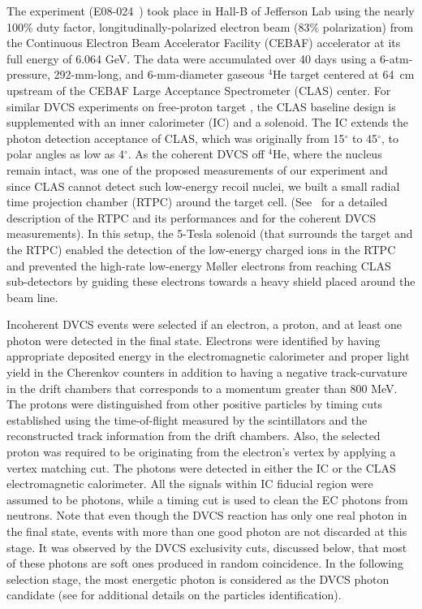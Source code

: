 \documentclass[twocolumn,nofootinbib,showpacs,prl,superscriptaddress,secnumarabic,amssymb,nobibnotes,aps,floatfix]{revtex4}
\begin{document}
The experiment (E08-024~\cite{Hafidi:2008pr}) took place in Hall-B of Jefferson 
Lab using the nearly 100\% duty factor, longitudinally-polarized electron beam 
(83$\%$ polarization) from the Continuous Electron Beam Accelerator Facility 
(CEBAF) accelerator at its full energy of 6.064 GeV. The data were accumulated 
over 40 days using a 6-atm-pressure, 292-mm-long, and 6-mm-diameter gaseous 
$^4$He target centered at 64~cm upstream of the CEBAF Large Acceptance 
Spectrometer (CLAS) center. For similar DVCS experiments on free-proton target
\cite{Girod:2007aa,Jo:2015ema}, the CLAS baseline design \cite{Mecking:2003zu} 
is supplemented with an inner calorimeter (IC) and a solenoid. The IC extends 
the photon detection acceptance of CLAS, which was originally from 15$^{\circ}$ 
to 45$^{\circ}$, to polar angles as low as 4$^{\circ}$. As the coherent DVCS 
off $^4$He, where the nucleus remain intact, was one of the proposed 
measurements of our experiment and since CLAS cannot detect such low-energy 
recoil nuclei, we built a small radial time projection chamber (RTPC) around 
the target cell. (See~\cite{Dupre:2017upj} for a detailed description of the 
RTPC and its performances and \cite{Hattawy:2017woc} for the coherent DVCS 
measurements). In this setup, the 5-Tesla solenoid (that surrounds the target 
and the RTPC) enabled the detection of the low-energy charged ions in the RTPC 
and prevented the high-rate low-energy M\o{}ller electrons from reaching CLAS 
sub-detectors by guiding these electrons towards a heavy shield placed around 
the beam line. 


Incoherent DVCS events were selected if an electron, a proton, and at least one 
photon were detected in the final state. Electrons were identified by having 
appropriate deposited energy in the electromagnetic calorimeter and proper 
light yield in the Cherenkov counters in addition to having a negative 
track-curvature in the drift chambers that corresponds to a momentum greater 
than 800 MeV. The protons were distinguished from other positive particles by 
timing cuts established using the time-of-flight measured by the scintillators 
and the reconstructed track information from the drift chambers. Also, the 
selected proton was required to be originating from the electron's vertex by 
applying a vertex matching cut. The photons were detected in either the IC or 
the CLAS electromagnetic calorimeter. All the signals within IC fiducial region 
were assumed to be photons, while a timing cut is used to clean the EC photons 
from neutrons. Note that even though the DVCS reaction has only one real photon 
in the final state, events with more than one good photon are not discarded at 
this stage. It was observed by the DVCS exclusivity cuts, discussed below, that 
most of these photons are soft ones produced in random coincidence. In the 
following selection stage, the most energetic photon is considered as the DVCS 
photon candidate (see \cite{Hattawy:thesis} for additional details on the 
particles identification).  
\end{document}
